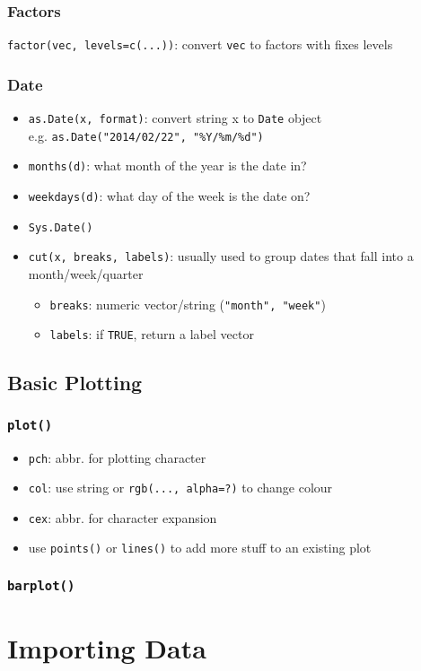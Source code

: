 \documentclass{article}
\begin{document}
\begin{multicols}{2}
\subsubsection*{Factors}
\texttt{factor(vec, levels=c(...))}: convert \texttt{vec} to factors with fixes levels

\subsubsection*{Date}
\begin{itemize}
	\item \texttt{as.Date(x, format)}: convert string x to \texttt{Date} object \\ e.g. \texttt{as.Date("2014/02/22", "\%Y/\%m/\%d")}
	\item \texttt{months(d)}: what month of the year is the date in?
	\item \texttt{weekdays(d)}: what day of the week is the date on?
	\item \texttt{Sys.Date()}
	\item \texttt{cut(x, breaks, labels)}: usually used to group dates that fall into a month/week/quarter
	\begin{itemize}
		\item \texttt{breaks}: numeric vector/string (\texttt{"month", "week"})
		\item \texttt{labels}: if \texttt{TRUE}, return a label vector
	\end{itemize}
	
\end{itemize}

\subsection*{Basic Plotting}
\subsubsection*{\texttt{plot()}}
\begin{itemize}
	\item \texttt{pch}: abbr. for plotting character
	\item \texttt{col}: use string or \texttt{rgb(..., alpha=?)} to change colour
	\item \texttt{cex}: abbr. for character expansion
	\item use \texttt{points()} or \texttt{lines()} to add more stuff to an existing plot
	
\end{itemize}
\subsubsection*{\texttt{barplot()}}

\section{Importing Data}
\end{multicols}
\end{document}
